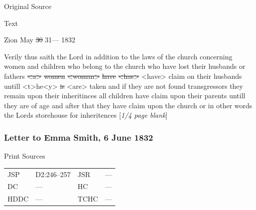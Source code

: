 			\begin{description}
				\item[Original Source]
			\end{description}
			
			
			\begin{description}
				\item[Text]
			\end{description}
			
				\begin{tightcenter}
				Zion May \sout{30} 31--- 1832
				\end{tightcenter}
				
				Verily thus saith the Lord in addition to the laws of the church concerning women and children who belong to the church who have lost their husbands or fathers \sout{<a>} \sout{women} \sout{<woman>} \sout{have} \sout{<has>} <have> claim on their husbands untill <t>he<y> \sout{is} <are> taken and if they are not found transgressors they remain upon their inheritinces all children have claim upon their parents untill they are of age and after that they have claim upon the church or in other words the Lords storehouse for inheritences [\textit{1/4 page blank}]
				
		\subsubsection{Letter to Emma Smith, 6 June 1832}
			\label{EMS-1832-JS-6-JUN-1832}
		
			\begin{description}
				\item[Print Sources]
			\end{description}

				\begin{tabular}{p{0.5in}p{1in}p{0.5in}p{1in}}
				JSP	 	& D2:246--257	& JSR 		& --- \\
				DC	 	& ---	 	& HC 		& --- \\
				HDDC 	& ---		& TCHC 		& --- \\
				\end{tabular}
			
